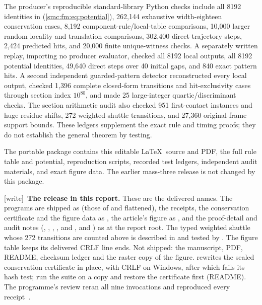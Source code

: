 \documentclass[11pt,letterpaper]{article}
\numberwithin{equation}{section}
\theoremstyle{definition}
\theoremstyle{remark}
\newcommand{\wtag}{\textup{[write]}}
\begin{document}
The producer's reproducible standard-library Python checks include all 8192
identities in (\ref{smc:fm:eq:potential}), 262,144 exhaustive width-eighteen
conservation cases, 8,192 component-rule/local-table comparisons, 10,000 larger
random locality and translation comparisons, 302,400 direct trajectory steps,
2,424 predicted hits, and 20,000 finite unique-witness checks. A separately
written replay, importing no producer evaluator, checked all 8192 local outputs,
all 8192 potential identities, 49,640 direct steps over 40 initial gaps, and
840 exact pattern hits. A second independent guarded-pattern detector
reconstructed every local output, checked 1,396 complete closed-form transitions
and hit-exclusivity cases through section index $10^{80}$, and made 25
large-integer quartic/discriminant checks. The section arithmetic audit also
checked 951 first-contact instances and huge residue shifts, 272 weighted-shuttle
transitions, and 27,360 original-frame support bounds. These ledgers supplement the exact rule and timing
proofs; they do not establish the general theorem by testing.

The portable package contains this editable \LaTeX\ source and PDF, the full
rule table and potential, reproduction scripts, recorded test ledgers,
independent audit materials, and exact figure data. The earlier mass-three
release is not changed by this package.

\wtag\ \textbf{The release in this report.} These are the delivered names. The programs are shipped as  (those of  and  flattened), the receipts, the conservation certificate and the figure data as , the article's figure as , and the proof-detail and audit notes (, , , , and ,  and ) as  at the report root. The typed weighted shuttle whose 272 transitions are counted above is described in  and tested by . The figure table  keeps its delivered CRLF line ends. Not shipped: the manuscript, PDF, README, checksum ledger and the raster copy of the figure.  rewrites the sealed conservation certificate in place, with CRLF on Windows, after which  fails its hash test; run the suite on a copy and restore the certificate first (README). The programme's review reran all nine invocations and reproduced every receipt~\cite{reviewlowmass}.
\end{document}
